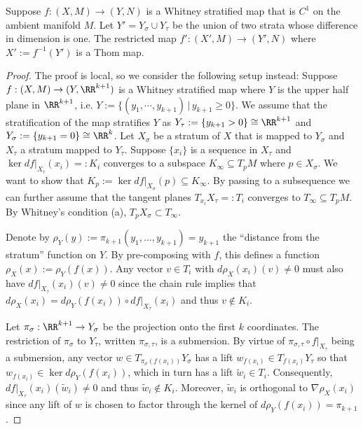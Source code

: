 \begin{lem}\label{lem:thom_codim}
	Suppose $f:(X,M)\to (Y,N)$ is a Whitney stratified map that is $C^1$ on the ambient manifold $M$. Let $Y'=Y_{\sigma}\cup Y_{\tau}$ be the union of two strata whose difference in dimension is one. The restricted map $f':(X',M)\to (Y',N)$ where $X':=f^{-1}(Y')$ is a Thom map.
\end{lem} 
\begin{proof}
	The proof is local, so we consider the following setup instead: Suppose $f:(X,M) \to (Y,\RR^{k+1})$ is a Whitney stratified map where $Y$ is the upper half plane in $\RR^{k+1}$, i.e. $Y:=\{(y_1,\cdots,y_{k+1})\,|\, y_{k+1}\geq 0\}$. We assume that the stratification of the map stratifies $Y$ as $Y_{\tau}:=\{y_{k+1}>0\}\cong \RR^{k+1}$ and $Y_{\sigma}:=\{y_{k+1}=0\}\cong \RR^k$. Let $X_{\sigma}$ be a stratum of $X$ that is mapped to $Y_{\sigma}$ and $X_{\tau}$ a stratum mapped to $Y_{\tau}$. Suppose $\{x_i\}$ is a sequence in $X_{\tau}$ and $\ker df|_{X_{\tau}}(x_i)=:K_i$ converges to a subspace $K_{\infty}\subseteq T_p M$ where $p\in X_{\sigma}$. We want to show that $K_p:=\ker df|_{X_{\sigma}}(p)\subseteq K_{\infty}$. By passing to a subsequence we can further assume that the tangent planes $T_{x_i} X_{\tau}=:T_i$ converges to $T_{\infty}\subseteq T_p M$. By Whitney's condition (a), $T_p X_{\sigma}\subset T_{\infty}$.
	
	Denote by $\rho_Y(y):=\pi_{k+1}(y_1,\ldots,y_{k+1})=y_{k+1}$ the ``distance from the stratum'' function on $Y$. By pre-composing with $f$, this defines a function $\rho_X(x):=\rho_Y(f(x))$. Any vector $v\in T_i$ with $d\rho_X(x_i)(v)\neq 0$ must also have $df|_{X_{\tau}}(x_i)(v)\neq 0$ since the chain rule implies that $d\rho_X(x_i)=d\rho_Y(f(x_i))\circ df|_{X_{\tau}}(x_i)$ and thus $v\notin K_i$.
	
	Let $\pi_{\sigma}:\RR^{k+1}\to Y_{\sigma}$ be the projection onto the first $k$ coordinates. The restriction of $\pi_{\sigma}$ to $Y_{\tau}$, written $\pi_{\sigma,\tau}$, is a submersion. By virtue of $\pi_{\sigma,\tau}\circ f|_{X_{\tau}}$ being a submersion, any vector $w\in T_{\pi_{\sigma}(f(x_i))} Y_{\sigma}$ has a lift $w_{f(x_i)}\in T_{f(x_i)}Y_{\tau}$ so that $w_{f(x_i)}\in \ker d\rho_Y(f(x_i))$, which in turn has a lift $\tilde{w}_i\in T_i$. Consequently, $df|_{X_{\tau}}(x_i)(\tilde{w}_i)\neq 0$ and thus $\tilde{w}_i\notin K_i$. Moreover, $\tilde{w}_i$ is orthogonal to $\nabla \rho_{X}(x_i)$ since any lift of $w$ is chosen to factor through the kernel of $d\rho_Y(f(x_i))=\pi_{k+1}$.
	

\end{proof}
